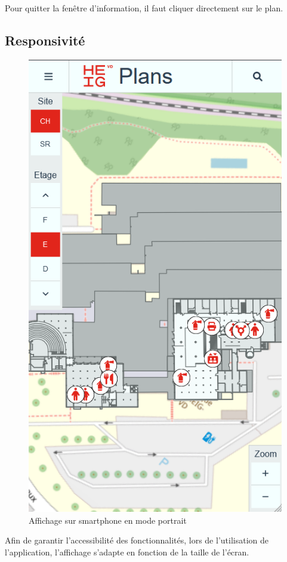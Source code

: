 \documentclass[
    iai, %
    il, %
]{heig-tb}
\begin{document}
Pour quitter la fenêtre d'information, il faut cliquer directement sur le plan.

\subsection{Responsivité}

\begin{figure}[h]
    \centering
    \includegraphics[scale=0.5]{frontend-responsive-portrait.png}
    \caption{Affichage sur smartphone en mode portrait}
\end{figure}

Afin de garantir l'accessibilité des fonctionnalités, lors de l'utilisation de l'application,
l'affichage s'adapte en fonction de la taille de l'écran.
\end{document}
